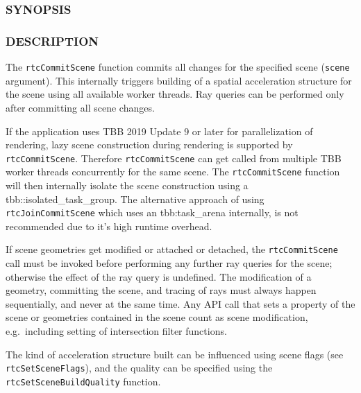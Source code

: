 \subsubsection{SYNOPSIS}\label{synopsis}

\begin{Shaded}
\begin{Highlighting}[]

\OperatorTok{(}\OperatorTok{);}
\end{Highlighting}
\end{Shaded}

\subsubsection{DESCRIPTION}\label{description}

The \texttt{rtcCommitScene} function commits all changes for the
specified scene (\texttt{scene} argument). This internally triggers
building of a spatial acceleration structure for the scene using all
available worker threads. Ray queries can be performed only after
committing all scene changes.

If the application uses TBB 2019 Update 9 or later for parallelization
of rendering, lazy scene construction during rendering is supported by
\texttt{rtcCommitScene}. Therefore \texttt{rtcCommitScene} can get
called from multiple TBB worker threads concurrently for the same scene.
The \texttt{rtcCommitScene} function will then internally isolate the
scene construction using a tbb::isolated\_task\_group. The alternative
approach of using \texttt{rtcJoinCommitScene} which uses an
tbb:task\_arena internally, is not recommended due to it's high runtime
overhead.

If scene geometries get modified or attached or detached, the
\texttt{rtcCommitScene} call must be invoked before performing any
further ray queries for the scene; otherwise the effect of the ray query
is undefined. The modification of a geometry, committing the scene, and
tracing of rays must always happen sequentially, and never at the same
time. Any API call that sets a property of the scene or geometries
contained in the scene count as scene modification, e.g.~including
setting of intersection filter functions.

The kind of acceleration structure built can be influenced using scene
flags (see \texttt{rtcSetSceneFlags}), and the quality can be specified
using the \texttt{rtcSetSceneBuildQuality} function.

